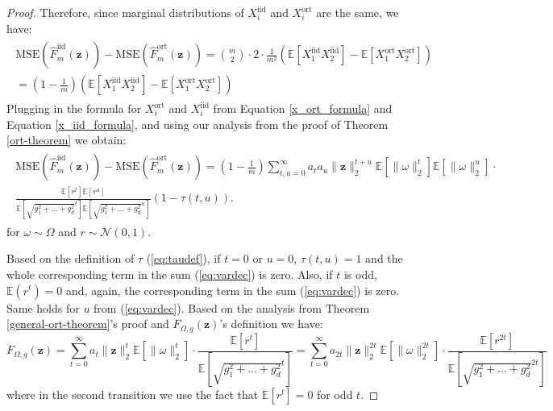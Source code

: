 \begin{proof}
Therefore, since marginal distributions of $X_{i}^{\mathrm{iid}}$ and $X_{i}^{\mathrm{ort}}$ are the same,  we have:
\begin{align}
\begin{split}
\label{mse-diff}
\mathrm{MSE}(\widehat{F}^{\mathrm{iid}}_{m}(\mathbf{z})) - \mathrm{MSE}(\widehat{F}^{\mathrm{ort}}_{m}(\mathbf{z})) = 
{m \choose 2} \cdot 2 \cdot \frac{1}{m^{2}}
(\mathbb{E}[X^{\mathrm{iid}}_{1}X^{\mathrm{iid}}_{2}]-
\mathbb{E}[X^{\mathrm{ort}}_{1}X^{\mathrm{ort}}_{2}])\\
=(1-\frac{1}{m})(\mathbb{E}[X^{\mathrm{iid}}_{1}X^{\mathrm{iid}}_{2}]-
\mathbb{E}[X^{\mathrm{ort}}_{1}X^{\mathrm{ort}}_{2}])
\end{split}
\end{align}
Plugging in the formula for $X^{\mathrm{ort}}_{i}$ and $X^{\mathrm{iid}}_{i}$ from Equation \ref{x_ort_formula} and Equation \ref{x_iid_formula}, and using our analysis from the proof of Theorem \ref{ort-theorem} we obtain:
\begin{align}
\begin{split}
 \mathrm{MSE}(\widehat{F}^{\mathrm{iid}}_{m}(\mathbf{z})) - \mathrm{MSE}(\widehat{F}^{\mathrm{ort}}_{m}(\mathbf{z})) =   
 (1-\frac{1}{m})\sum_{t,u=0}^{\infty}a_{t}a_{u}\|\mathbf{z}\|_{2}^{t+u}
 \mathbb{E}[\|\omega\|_{2}^{t}] \mathbb{E}[\|\omega\|_{2}^{u}] \cdot \\
\frac{\mathbb{E}[r^{t}]\mathbb{E}[r^{u}]}
{\mathbb{E}[\sqrt{g_{1}^{2}+...+g_{d}^{2}}^{t}]
\mathbb{E}[\sqrt{g_{1}^{2}+...+g_{d}^{2}}^{u}]}
(1-\tau(t, u)). \label{eq:vardec}
\end{split} 
\end{align}
for $\omega \sim \Omega$ and $r \sim \mathcal{N}(0, 1)$.

Based on the definition of $\tau$ (\ref{eq:taudef}), if $t = 0$ or $u = 0$, $\tau (t, u) = 1$ and the whole corresponding term in the sum (\ref{eq:vardec}) is zero. Also, if $t$ is odd, $\mathbb{E}(r^t) = 0$ and, again, the corresponding term in the sum (\ref{eq:vardec}) is zero. Same holds for $u$ from (\ref{eq:vardec}). Based on the analysis from Theorem \ref{general-ort-theorem}'s proof and $F_{\Omega,g}(\mathbf{z})$'s definition we have:
\begin{equation*}
    F_{\Omega,g}(\mathbf{z})  = \sum_{t=0}^{\infty}a_{t}\|\mathbf{z}\|_{2}^{t}
 \mathbb{E}[\|\omega\|_{2}^{t}] \cdot 
\frac{\mathbb{E}[r^{t}]}
{\mathbb{E}[\sqrt{g_{1}^{2}+...+g_{d}^{2}}^{t}]} = \sum_{t=0}^{\infty}a_{2 t}\|\mathbf{z}\|_{2}^{2 t}
 \mathbb{E}[\|\omega\|_{2}^{2 t}] \cdot 
\frac{\mathbb{E}[r^{2 t}]}
{\mathbb{E}[\sqrt{g_{1}^{2}+...+g_{d}^{2}}^{2 t}]}
\end{equation*}
where in the second transition we use the fact that $\mathbb{E}[r^{t}] = 0$ for odd $t$.



\end{proof}
